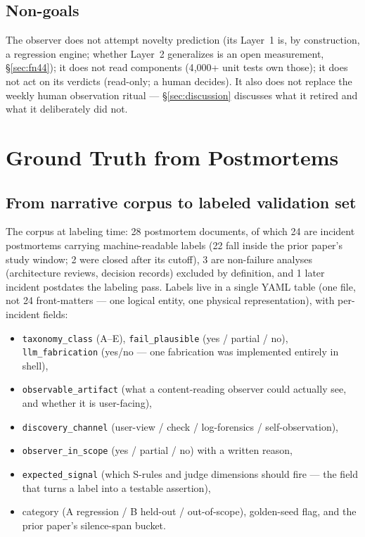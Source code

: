 \documentclass[11pt]{article}
\begin{document}
\subsection{Non-goals}

The observer does not attempt novelty prediction (its Layer~1 is, by
construction, a regression engine; whether Layer~2 generalizes is an
open measurement, \S\ref{sec:fn44}); it does not read components
(4{,}000+ unit tests own those); it does not act on its verdicts
(read-only; a human decides). It also does not replace the weekly human
observation ritual --- \S\ref{sec:discussion} discusses what it retired
and what it deliberately did not.

\section{Ground Truth from Postmortems}
\label{sec:groundtruth}

\subsection{From narrative corpus to labeled validation set}

The corpus at labeling time: 28 postmortem documents, of which 24 are
incident postmortems carrying machine-readable labels (22 fall inside
the prior paper's study window; 2 were closed after its cutoff), 3 are
non-failure analyses (architecture reviews, decision records) excluded
by definition, and 1 later incident postdates the labeling pass. Labels
live in a single YAML table (one file, not 24 front-matters --- one
logical entity, one physical representation), with per-incident fields:

\begin{itemize}
\item \texttt{taxonomy\_class} (A--E), \texttt{fail\_plausible}
  (yes / partial / no), \texttt{llm\_fabrication} (yes/no --- one
  fabrication was implemented entirely in shell),
\item \texttt{observable\_artifact} (what a content-reading observer
  could actually see, and whether it is user-facing),
\item \texttt{discovery\_channel} (user-view / check / log-forensics /
  self-observation),
\item \texttt{observer\_in\_scope} (yes / partial / no) with a written
  reason,
\item \texttt{expected\_signal} (which S-rules and judge dimensions
  should fire --- the field that turns a label into a testable
  assertion),
\item category (A regression / B held-out / out-of-scope), golden-seed
  flag, and the prior paper's silence-span bucket.
\end{itemize}
\end{document}
